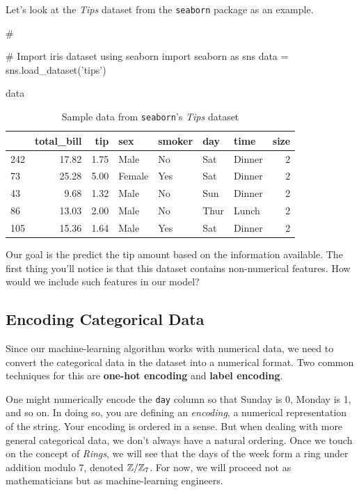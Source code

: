 Let's look at the \emph{Tips} dataset from the \texttt{seaborn} package as an example.

\begin{codeblock}
# %

# Import iris dataset using seaborn
import seaborn as sns
data = sns.load_dataset('tips')

data
\end{codeblock}

\begin{table}[ht]
    \centering
    \begin{tabular}{lrrllllr}
        \toprule
        & total\_bill & tip & sex & smoker & day & time & size \\
        \midrule
        242 & 17.82 & 1.75 & Male & No & Sat & Dinner & 2 \\
        73 & 25.28 & 5.00 & Female & Yes & Sat & Dinner & 2 \\
        43 & 9.68 & 1.32 & Male & No & Sun & Dinner & 2 \\
        86 & 13.03 & 2.00 & Male & No & Thur & Lunch & 2 \\
        105 & 15.36 & 1.64 & Male & Yes & Sat & Dinner & 2 \\
        \bottomrule
    \end{tabular}
    \caption{Sample data from \texttt{seaborn}'s \emph{Tips} dataset}
    \label{tab:sample_data}
\end{table}

Our goal is the predict the tip amount based on the information available. The first thing you'll notice is that this dataset contains non-numerical features. How would we include such features in our model?

\subsection{Encoding Categorical Data}
\label{subsec:3}

Since our machine-learning algorithm works with numerical data, we need to convert the categorical data in the dataset into a numerical format. Two common techniques for this are \textbf{one-hot encoding} and \textbf{label encoding}.

One might numerically encode the \texttt{day} column so that Sunday is 0, Monday is 1, and so on. In doing so, you are defining an \emph{encoding}, a numerical representation of the string. Your encoding is ordered in a sense. But when dealing with more general categorical data, we don't always have a natural ordering. Once we touch on the concept of \emph{Rings}, we will see that the days of the week form a ring under addition modulo 7, denoted $\mathbb{Z}/\mathbb{Z}_7$. For now, we will proceed not as mathematicians but as machine-learning engineers.


